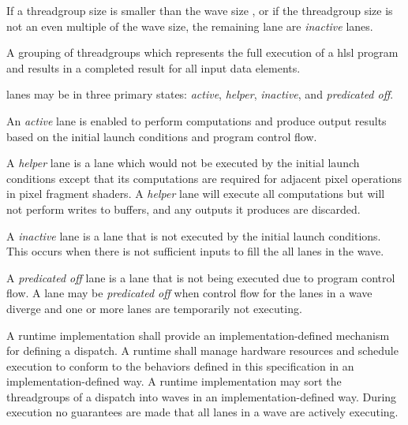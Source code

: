 \p If a \gls{threadgroup} size is smaller than the \gls{wave} size , or if the
\gls{threadgroup} size is not an even multiple of the \gls{wave} size, the
remaining \gls{lane} are \textit{inactive} \gls{lane}s.


\p A grouping of \gls{threadgroup}s which represents the full execution of a
\acrshort{hlsl} program and results in a completed result for all input data
elements.


\p \gls{lane}s may be in three primary states: \textit{active}, \textit{helper},
\textit{inactive}, and \textit{predicated off}.

\p An \textit{active} \gls{lane} is enabled to perform computations and produce
output results based on the initial launch conditions and program control flow.

\p A \textit{helper} \gls{lane} is a lane which would not be executed by the
initial launch conditions except that its computations are required for adjacent
pixel operations in pixel fragment shaders. A \textit{helper} \gls{lane} will
execute all computations but will not perform writes to buffers, and any outputs
it produces are discarded.

\p A \textit{inactive} \gls{lane} is a lane that is not executed by the initial
launch conditions. This occurs when there is not sufficient inputs to fill the
all \gls{lane}s in the \gls{wave}.

\p A \textit{predicated off} \gls{lane} is a lane that is not being executed due
to program control flow. A \gls{lane} may be \textit{predicated off} when
control flow for the \gls{lane}s in a \gls{wave} diverge and one or more lanes
are temporarily not executing.


\p A runtime implementation shall provide an implementation-defined mechanism
for defining a \gls{dispatch}. A runtime shall manage hardware resources and
schedule execution to conform to the behaviors defined in this specification in
an implementation-defined way. A runtime implementation may sort the
\gls{threadgroup}s of a \gls{dispatch} into \gls{wave}s in an
implementation-defined way. During execution no guarantees are made that all
\gls{lane}s in a \gls{wave} are actively executing.


